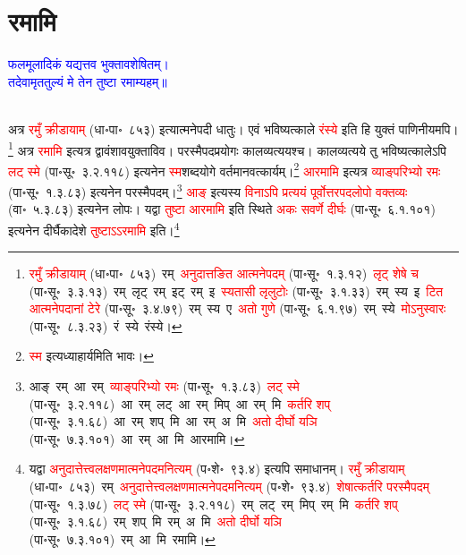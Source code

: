 \section[रमामि]{रमामि}
\centering\textcolor{blue}{फलमूलादिकं यद्यत्तव भुक्तावशेषितम्।\nopagebreak\\
तदेवामृततुल्यं मे तेन तुष्टा रमाम्यहम्॥}\nopagebreak\\
\\
\fontsize{14}{21}\selectfont\begin{sloppypar}\justifying\noindent\hspace{10mm} अत्र \textcolor{red}{रमुँ क्रीडायाम्} (धा॰पा॰~८५३) इत्यात्मनेपदी धातुः। एवं भविष्यत्काले \textcolor{red}{रंस्ये} इति हि युक्तं पाणिनीयमपि।\footnote{\textcolor{red}{रमुँ क्रीडायाम्} (धा॰पा॰~८५३)~\arrow रम्~\arrow \textcolor{red}{अनुदात्तङित आत्मने\-पदम्} (पा॰सू॰~१.३.१२)~\arrow \textcolor{red}{लृट् शेषे च} (पा॰सू॰~३.३.१३)~\arrow रम्~लृट्~\arrow रम्~इट्~\arrow रम्~इ~\arrow \textcolor{red}{स्यतासी लृलुटोः} (पा॰सू॰~३.१.३३)~\arrow रम्~स्य~इ~\arrow \textcolor{red}{टित आत्मनेपदानां टेरे} (पा॰सू॰~३.४.७९)~\arrow रम्~स्य~ए~\arrow \textcolor{red}{अतो गुणे} (पा॰सू॰~६.१.९७)~\arrow रम्~स्ये~\arrow \textcolor{red}{मोऽनुस्वारः} (पा॰सू॰~८.३.२३)~\arrow रं~स्ये~\arrow रंस्ये।} अत्र \textcolor{red}{रमामि} इत्यत्र द्वावंशावयुक्ताविव। परस्मैपद\-प्रयोगः काल\-व्यत्ययश्च। कालव्यत्यये तु भविष्यत्कालेऽपि \textcolor{red}{लट् स्मे} (पा॰सू॰~३.२.११८) इत्यनेन \textcolor{red}{स्म}\-शब्द\-योगे वर्तमानवत्कार्यम्।\footnote{\textcolor{red}{स्म} इत्यध्याहार्यमिति भावः।} \textcolor{red}{आरमामि} इत्यत्र \textcolor{red}{व्याङ्परिभ्यो रमः} (पा॰सू॰~१.३.८३) इत्यनेन परस्मैपदम्।\footnote{आङ्~रम्~\arrow आ~रम्~\arrow \textcolor{red}{व्याङ्परिभ्यो रमः} (पा॰सू॰~१.३.८३)~\arrow \textcolor{red}{लट् स्मे} (पा॰सू॰~३.२.११८)~\arrow आ~रम्~लट्~\arrow आ~रम्~मिप्~\arrow आ~रम्~मि~\arrow \textcolor{red}{कर्तरि शप्‌} (पा॰सू॰~३.१.६८)~\arrow आ~रम्~शप्~मि~\arrow आ~रम्~अ~मि~\arrow \textcolor{red}{अतो दीर्घो यञि} (पा॰सू॰~७.३.१०१)~\arrow आ~रम्~आ~मि~\arrow आरमामि।} \textcolor{red}{आङ्} इत्यस्य \textcolor{red}{विनाऽपि प्रत्ययं पूर्वोत्तर\-पद\-लोपो वक्तव्यः} (वा॰~५.३.८३) इत्यनेन लोपः। यद्वा \textcolor{red}{तुष्टा आरमामि} इति स्थिते \textcolor{red}{अकः सवर्णे दीर्घः} (पा॰सू॰~६.१.१०१) इत्यनेन दीर्घैकादेशे \textcolor{red}{तुष्टाऽऽरमामि} इति।\footnote{यद्वा \textcolor{red}{अनुदात्तेत्त्व\-लक्षणमात्मने\-पदमनित्यम्} (प॰शे॰~९३.४) इत्यपि समाधानम्। \textcolor{red}{रमुँ क्रीडायाम्} (धा॰पा॰~८५३)~\arrow रम्~\arrow \textcolor{red}{अनुदात्तेत्त्व\-लक्षणमात्मने\-पदमनित्यम्} (प॰शे॰~९३.४)~\arrow \textcolor{red}{शेषात्कर्तरि परस्मैपदम्} (पा॰सू॰~१.३.७८)~\arrow \textcolor{red}{लट् स्मे} (पा॰सू॰~३.२.११८)~\arrow रम्~लट्~\arrow रम्~मिप्~\arrow रम्~मि~\arrow \textcolor{red}{कर्तरि शप्‌} (पा॰सू॰~३.१.६८)~\arrow रम्~शप्~मि~\arrow रम्~अ~मि~\arrow \textcolor{red}{अतो दीर्घो यञि} (पा॰सू॰~७.३.१०१)~\arrow रम्~आ~मि~\arrow रमामि।}\end{sloppypar}

